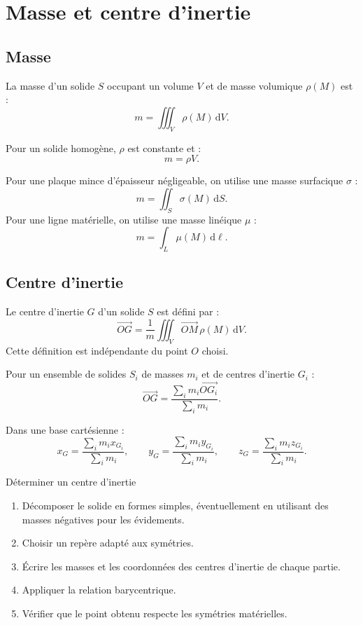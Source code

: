 
\section{Masse et centre d'inertie}
\label{sec:am-8}

\subsection{Masse}

La masse d'un solide $S$ occupant un volume $V$ et de masse volumique $\rho(M)$ est :
\[
m=\iiint_V \rho(M)\,\mathrm dV.
\]

Pour un solide homogène, $\rho$ est constante et :
\[
m=\rho V.
\]

Pour une plaque mince d'épaisseur négligeable, on utilise une masse surfacique $\sigma$ :
\[
m=\iint_S \sigma(M)\,\mathrm dS.
\]
Pour une ligne matérielle, on utilise une masse linéique $\mu$ :
\[
m=\int_L \mu(M)\,\mathrm d\ell.
\]

\subsection{Centre d'inertie}

Le centre d'inertie $G$ d'un solide $S$ est défini par :
\[
\overrightarrow{OG}=\frac{1}{m}\iiint_V \overrightarrow{OM}\,\rho(M)\,\mathrm dV.
\]
Cette définition est indépendante du point $O$ choisi.

Pour un ensemble de solides $S_i$ de masses $m_i$ et de centres d'inertie $G_i$ :
\[
\overrightarrow{OG}=
\frac{\displaystyle\sum_i m_i\overrightarrow{OG_i}}
{\displaystyle\sum_i m_i}.
\]

Dans une base cartésienne :
\[
x_G=\frac{\sum_i m_i x_{G_i}}{\sum_i m_i},
\qquad
y_G=\frac{\sum_i m_i y_{G_i}}{\sum_i m_i},
\qquad z_G=\frac{\sum_i m_i z_{G_i}}{\sum_i m_i}.
\]

\begin{TLMethod}{Déterminer un centre d'inertie}
\begin{enumerate}
  \item Décomposer le solide en formes simples, éventuellement en utilisant des masses négatives pour les évidements.
  \item Choisir un repère adapté aux symétries.
  \item Écrire les masses et les coordonnées des centres d'inertie de chaque partie.
  \item Appliquer la relation barycentrique.
  \item Vérifier que le point obtenu respecte les symétries matérielles.
\end{enumerate}
\end{TLMethod}


